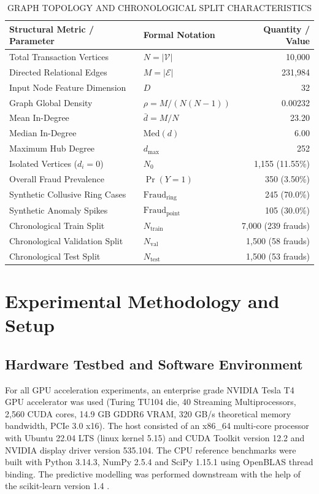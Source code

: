 \documentclass[journal]{IEEEtran}
\begin{document}
\begin{table}[!t]
\centering
\caption{GRAPH TOPOLOGY AND CHRONOLOGICAL SPLIT CHARACTERISTICS}
\label{tab:topology}
\begin{tabular}{llr}
\toprule
\textbf{Structural Metric / Parameter} & \textbf{Formal Notation} & \textbf{Quantity / Value} \\
\midrule
Total Transaction Vertices & $N = |\mathcal{V}|$ & 10,000 \\
Directed Relational Edges & $M = |\mathcal{E}|$ & 231,984 \\
Input Node Feature Dimension & $D$ & 32 \\
Graph Global Density & $\rho = M / (N(N - 1))$ & 0.00232 \\
Mean In-Degree & $\bar{d} = M / N$ & 23.20 \\
Median In-Degree & $\text{Med}(d)$ & 6.00 \\
Maximum Hub Degree & $d_{\text{max}}$ & 252 \\
Isolated Vertices ($d_i = 0$) & $N_0$ & 1,155 (11.55\%) \\
Overall Fraud Prevalence & $\Pr(Y = 1)$ & 350 (3.50\%) \\
Synthetic Collusive Ring Cases & $\text{Fraud}_{\text{ring}}$ & 245 (70.0\%) \\
Synthetic Anomaly Spikes & $\text{Fraud}_{\text{point}}$ & 105 (30.0\%) \\
Chronological Train Split & $N_{\text{train}}$ & 7,000 (239 frauds) \\
Chronological Validation Split & $N_{\text{val}}$ & 1,500 (58 frauds) \\
Chronological Test Split & $N_{\text{test}}$ & 1,500 (53 frauds) \\
\bottomrule
\end{tabular}
\end{table}

\section{Experimental Methodology and Setup}

\subsection{Hardware Testbed and Software Environment}
For all GPU acceleration experiments, an enterprise grade NVIDIA Tesla T4 GPU accelerator was used (Turing TU104 die, 40 Streaming Multiprocessors, 2,560 CUDA cores, 14.9 GB GDDR6 VRAM, 320 GB/s theoretical memory bandwidth, PCIe 3.0 x16). The host consisted of an x86\_64 multi-core processor with Ubuntu 22.04 LTS (linux kernel 5.15) and CUDA Toolkit version 12.2 and NVIDIA display driver version 535.104. The CPU reference benchmarks were built with Python 3.14.3, NumPy 2.5.4 and SciPy 1.15.1 \cite{virtanen2020scipy} using OpenBLAS thread binding. The predictive modelling was performed downstream with the help of the scikit-learn version 1.4 \cite{pedregosa2011scikit}.
\end{document}
